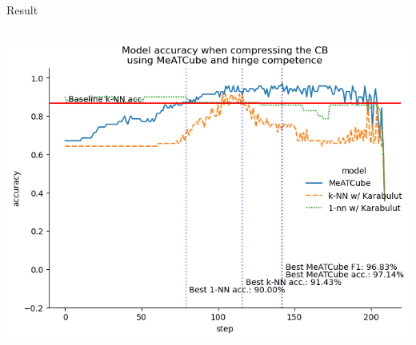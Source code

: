 \documentclass[]{beamer}
\begin{document}
\begin{frame}{Result}
\begin{columns}
\begin{column}{.65\textwidth}
            \includegraphics[width=.8\textwidth]{../results-weight-estim+/figs/ionosphere.png}
        \end{column}
    \end{columns}
\end{frame}
\end{document}
